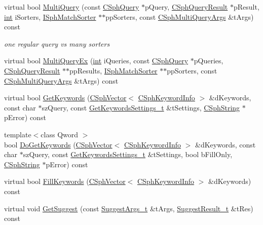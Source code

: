 \begin{DoxyCompactItemize}
virtual bool \hyperlink{classCSphIndex__VLN_a0f92cfbe694c5f18a60a620986e0e7e5}{Multi\-Query} (const \hyperlink{classCSphQuery}{C\-Sph\-Query} $\ast$p\-Query, \hyperlink{classCSphQueryResult}{C\-Sph\-Query\-Result} $\ast$p\-Result, \hyperlink{sphinxexpr_8cpp_a4a26e8f9cb8b736e0c4cbf4d16de985e}{int} i\-Sorters, \hyperlink{classISphMatchSorter}{I\-Sph\-Match\-Sorter} $\ast$$\ast$pp\-Sorters, const \hyperlink{structCSphMultiQueryArgs}{C\-Sph\-Multi\-Query\-Args} \&t\-Args) const 
\begin{DoxyCompactList}\small\item\em one regular query vs many sorters \end{DoxyCompactList}\item 
virtual bool \hyperlink{classCSphIndex__VLN_ac7a479cbb120f5e26eda9524b76fe1c1}{Multi\-Query\-Ex} (\hyperlink{sphinxexpr_8cpp_a4a26e8f9cb8b736e0c4cbf4d16de985e}{int} i\-Queries, const \hyperlink{classCSphQuery}{C\-Sph\-Query} $\ast$p\-Queries, \hyperlink{classCSphQueryResult}{C\-Sph\-Query\-Result} $\ast$$\ast$pp\-Results, \hyperlink{classISphMatchSorter}{I\-Sph\-Match\-Sorter} $\ast$$\ast$pp\-Sorters, const \hyperlink{structCSphMultiQueryArgs}{C\-Sph\-Multi\-Query\-Args} \&t\-Args) const 
\item 
virtual bool \hyperlink{classCSphIndex__VLN_ace717440ec35b62b73f8e5fac5bee4b5}{Get\-Keywords} (\hyperlink{classCSphVector}{C\-Sph\-Vector}$<$ \hyperlink{structCSphKeywordInfo}{C\-Sph\-Keyword\-Info} $>$ \&d\-Keywords, const char $\ast$sz\-Query, const \hyperlink{structGetKeywordsSettings__t}{Get\-Keywords\-Settings\-\_\-t} \&t\-Settings, \hyperlink{structCSphString}{C\-Sph\-String} $\ast$p\-Error) const 
\item 
{\footnotesize template$<$class Qword $>$ }\\bool \hyperlink{classCSphIndex__VLN_a92e455134b4484ce071906d7b3c4148f}{Do\-Get\-Keywords} (\hyperlink{classCSphVector}{C\-Sph\-Vector}$<$ \hyperlink{structCSphKeywordInfo}{C\-Sph\-Keyword\-Info} $>$ \&d\-Keywords, const char $\ast$sz\-Query, const \hyperlink{structGetKeywordsSettings__t}{Get\-Keywords\-Settings\-\_\-t} \&t\-Settings, bool b\-Fill\-Only, \hyperlink{structCSphString}{C\-Sph\-String} $\ast$p\-Error) const 
\item 
virtual bool \hyperlink{classCSphIndex__VLN_a6f6cfe56247312a406f5679933adbf91}{Fill\-Keywords} (\hyperlink{classCSphVector}{C\-Sph\-Vector}$<$ \hyperlink{structCSphKeywordInfo}{C\-Sph\-Keyword\-Info} $>$ \&d\-Keywords) const 
\item 
virtual void \hyperlink{classCSphIndex__VLN_ae1371f4eb4f003e09441722ef1ad3119}{Get\-Suggest} (const \hyperlink{structSuggestArgs__t}{Suggest\-Args\-\_\-t} \&t\-Args, \hyperlink{structSuggestResult__t}{Suggest\-Result\-\_\-t} \&t\-Res) const 
$$
\end{DoxyCompactItemize}
